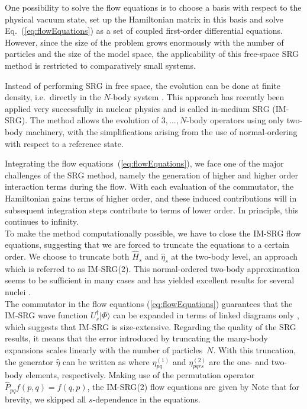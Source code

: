 \documentclass[aps,twocolumn,showpacs,floatfix,nofootinbib,preprintnumbers,superscriptaddress,amsmath,amssymb]{revtex4-1}
\begin{document}
One possibility to solve the flow equations is to choose a basis with
respect to the physical vacuum state, set up the Hamiltonian matrix in
this basis and solve Eq.~(\ref{eq:flowEquations}) as a set of coupled
first-order differential equations. However, since the size of the
problem grows enormously with the number of particles and the size of
the model space, the applicability of this free-space SRG method is
restricted to comparatively small systems.

Instead of performing SRG in free space, the evolution can be done at
finite density, i.e.~directly in the $N$-body system
\cite{kehrein2006flow}. This approach has recently been applied very
successfully in nuclear physics \cite{IMSRG,PhysRevLett.106.222502}
and is called in-medium SRG (IM-SRG). The method allows the evolution
of $3,...,N$-body operators using only two-body machinery, with the
simplifications arising from the use of normal-ordering with respect
to a reference state.


Integrating the flow equations~(\ref{eq:flowEquations}), we face one
of the major challenges of the SRG method, namely the generation of
higher and higher order interaction terms during the flow. With each
evaluation of the commutator, the Hamiltonian gains terms of higher
order, and these induced contributions will in subsequent integration
steps contribute to terms of lower order. In principle, this continues
to infinity.\\ To make the method computationally possible, we have to
close the IM-SRG flow equations, suggesting that we are forced to
truncate the equations to a certain order. We choose to truncate both
$\hat{H}_s$ and $\hat{\eta}_s$ at the two-body level, an approach
which is referred to as IM-SRG(2).  This normal-ordered two-body
approximation seems to be sufficient in many cases and has yielded
excellent results for several nuclei
\cite{PhysRevLett.106.222502,PhysRevLett.109.052501,IMSRG}.\\ The
commutator in the flow equations (\ref{eq:flowEquations}) guarantees
that the IM-SRG wave function $U_s^\dagger|\Phi\rangle$ can be
expanded in terms of linked diagrams only
\cite{shavittbartlett2009,ISI:A1981MN73700014}, which suggests that IM-SRG
is size-extensive. Regarding the quality of the SRG results, it means
that the error introduced by truncating the many-body expansions
scales linearly with the number of particles~$N$. With this
truncation, the generator $\hat{\eta}$ can be written as
where $\eta_{pq}^{(1)}$ and $ \eta_{pqrs}^{(2)}$ are the one- and
two-body elements, respectively. Making use of the permutation
operator $ \hat{P}_{pq}f(p,q) = f(q,p)$, the IM-SRG(2) flow equations
are given by
Note that for brevity, we skipped all $s$-dependence in the equations.
\end{document}
